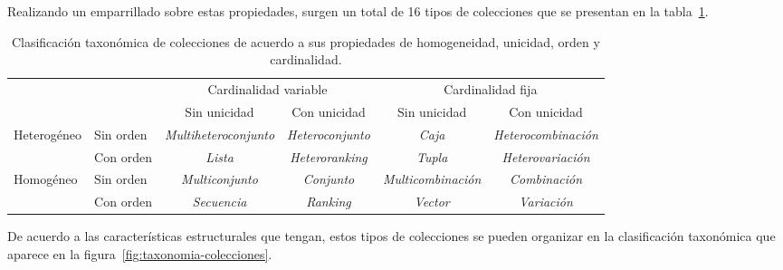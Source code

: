 \documentclass[a4paper,10pt,twoside]{article}
\theoremstyle{definition}
\begin{document}
Realizando un emparrillado sobre estas propiedades, surgen un total de 16 tipos de colecciones que se presentan en la
tabla~\ref{tab:taxonomia-colecciones}.

\vspace*{3cm}
\begin{table}[htbp!]
\caption{Clasificación taxonómica de colecciones de acuerdo a sus propiedades de homogeneidad, unicidad, orden y cardinalidad.\label{tab:taxonomia-colecciones}}
\setlength{\tabcolsep}{0.63mm}
\begin{center}
\begin{tabular}{|l|l|l|l|l|l|}
\cline{3-6}
\multicolumn{2}{c|}{} & \multicolumn{2}{c|}{Cardinalidad variable} & \multicolumn{2}{c|}{Cardinalidad fija}\\
\cline{3-6}
\multicolumn{2}{c|}{} & \multicolumn{1}{c|}{Sin unicidad} & \multicolumn{1}{c|}{Con unicidad} &
\multicolumn{1}{c|}{Sin unicidad} & \multicolumn{1}{c|}{Con unicidad}\\
\hline
\multirow{2}{2cm}{Heterogéneo} & Sin orden & \multicolumn{1}{c|}{\emph{Multiheteroconjunto}} &
\multicolumn{1}{c|}{\emph{Heteroconjunto}} & \multicolumn{1}{c|}{\emph{Caja}} &
\multicolumn{1}{c|}{\emph{Heterocombinación}}\\
\cline{2-6}
 & Con orden & \multicolumn{1}{c|}{\emph{Lista}} & \multicolumn{1}{c|}{\emph{Heteroranking}} &
 \multicolumn{1}{c|}{\emph{Tupla}} & \multicolumn{1}{c|}{\emph{Heterovariación}}\\
\hline
\multirow{2}{2cm}{Homogéneo} & Sin orden & \multicolumn{1}{c|}{\emph{Multiconjunto}} &
\multicolumn{1}{c|}{\emph{Conjunto}} & \multicolumn{1}{c|}{\emph{Multicombinación}} &
\multicolumn{1}{c|}{\emph{Combinación}}\\
\cline{2-6}
 & Con orden & \multicolumn{1}{c|}{\emph{Secuencia}} & \multicolumn{1}{c|}{\emph{Ranking}} &
 \multicolumn{1}{c|}{\emph{Vector}} & \multicolumn{1}{c|}{\emph{Variación}}\\
\hline
\end{tabular}
\end{center}
\end{table}

De acuerdo a las características estructurales que tengan, estos tipos de colecciones se pueden organizar en la clasificación taxonómica que aparece en la figura~\ref{fig:taxonomia-colecciones}.
\end{document}
